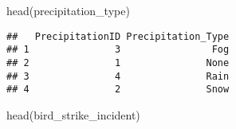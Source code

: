 \documentclass[
]{article}
\newenvironment{Shaded}{\begin{snugshade}}{\end{snugshade}}
\newcommand{\FunctionTok}[1]{\textcolor[rgb]{0.00,0.00,0.00}{#1}}
\newcommand{\NormalTok}[1]{#1}
\begin{document}
\begin{Shaded}
\begin{Highlighting}[]
\FunctionTok{head}\NormalTok{(precipitation\_type)}
\end{Highlighting}
\end{Shaded}

\begin{verbatim}
##   PrecipitationID Precipitation_Type
## 1               3                Fog
## 2               1               None
## 3               4               Rain
## 4               2               Snow
\end{verbatim}

\begin{Shaded}
\begin{Highlighting}[]
\FunctionTok{head}\NormalTok{(bird\_strike\_incident)}
\end{Highlighting}
\end{Shaded}
\end{document}
